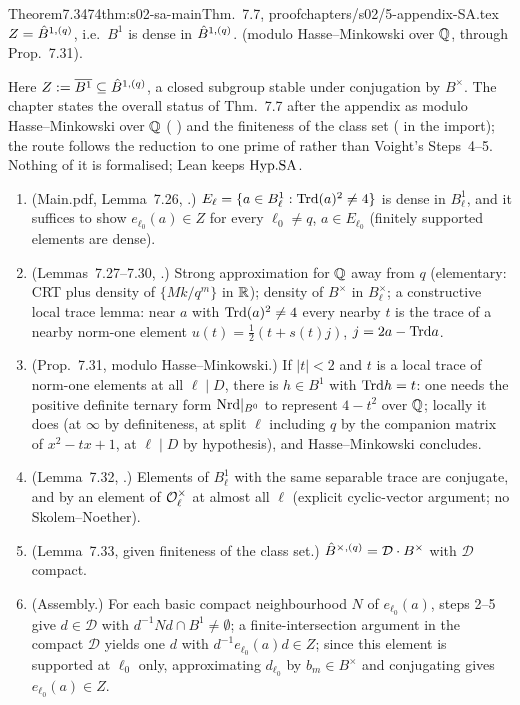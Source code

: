 \begin{quoted}{Theorem}{7.34}{74}{thm:s02-sa-main}{Thm.~7.7, proof}{chapters/s02/5-appendix-SA.tex}\label{rpt:thm:s02-sa-main}
$Z=\hat{B}^{1,(q)}$, i.e.\ $B^1$ is dense in $\hat{B}^{1,(q)}$.
\stpmc{} (modulo Hasse--Minkowski over $\mathbb{Q}$, through Prop.~7.31).
\end{quoted}
\begin{outline}
Here $Z:=\overline{B^1}\subseteq\hat{B}^{1,(q)}$, a closed subgroup stable under conjugation by $B^\times$. The chapter states the
overall status of Thm.~7.7 after the appendix as \stpmc{} modulo Hasse--Minkowski over $\mathbb{Q}$ (\stcited{} \cite[Thm.~14.3.3, p.~223]{Vo}) and
the finiteness of the class set (\stformal{} in the import); the route follows the reduction to one prime of
\cite[Ch.~III, proof of Thm.~4.3, pp.~81--82]{Vigneras1980} rather than Voight's Steps~4--5. Nothing of it is formalised; Lean keeps $\mathrm{Hyp.SA}$.
\begin{enumerate}
\item (Main.pdf, Lemma~7.26, \stproved.) $E_\ell=\{a\in B^1_\ell:\mathrm{Trd}(a)^2\ne4\}$ is dense in $B^1_\ell$, and it suffices to show
$e_{\ell_0}(a)\in Z$ for every $\ell_0\ne q$, $a\in E_{\ell_0}$ (finitely supported elements are dense).
\item (Lemmas~7.27--7.30, \stproved.) Strong approximation for $\mathbb{Q}$ away from $q$ (elementary: CRT plus density of
$\{Mk/q^m\}$ in $\mathbb{R}$); density of $B^\times$ in $B^\times_\ell$; a constructive local trace lemma: near $a$ with
$\mathrm{Trd}(a)^2\ne4$ every nearby $t$ is the trace of a nearby norm-one element $u(t)=\frac12(t+s(t)j)$, $j=2a-\mathrm{Trd} a$.
\item (Prop.~7.31, \stpmc{} modulo Hasse--Minkowski.) If $|t|<2$ and $t$ is a local trace of norm-one elements at all
$\ell\mid D$, there is $h\in B^1$ with $\mathrm{Trd} h=t$: one needs the positive definite ternary form $\mathrm{Nrd}|_{B^0}$ to represent $4-t^2$
over $\mathbb{Q}$; locally it does (at $\infty$ by definiteness, at split $\ell$ including $q$ by the companion matrix of $x^2-tx+1$, at $\ell\mid D$
by hypothesis), and Hasse--Minkowski concludes.
\item (Lemma~7.32, \stproved.) Elements of $B^1_\ell$ with the same separable trace are conjugate, and by an element of
$\mathcal{O}_\ell^\times$ at almost all $\ell$ (explicit cyclic-vector argument; no Skolem--Noether).
\item (Lemma~7.33, \stproved{} given finiteness of the class set.) $\hat{B}^{\times,(q)}=\mathcal D\cdot B^\times$ with $\mathcal D$ compact.
\item (Assembly.) For each basic compact neighbourhood $N$ of $e_{\ell_0}(a)$, steps 2--5 give $d\in\mathcal D$ with
$d^{-1}Nd\cap B^1\ne\emptyset$; a finite-intersection argument in the compact $\mathcal D$ yields one $d$ with
$d^{-1}e_{\ell_0}(a)d\in Z$; since this element is supported at $\ell_0$ only, approximating $d_{\ell_0}$ by $b_m\in B^\times$ and
conjugating gives $e_{\ell_0}(a)\in Z$.
\end{enumerate}
\end{outline}

